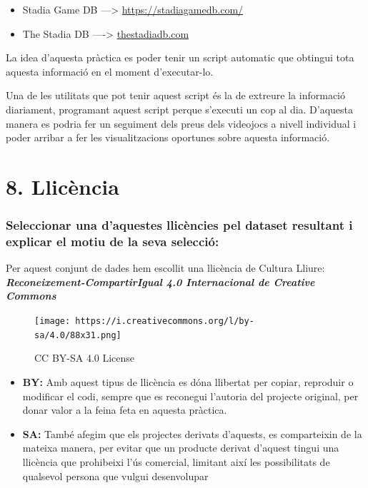 \documentclass[]{article}
\providecommand{\tightlist}{%
  \setlength{\itemsep}{0pt}\setlength{\parskip}{0pt}}
\begin{document}
\begin{itemize}
\tightlist
\item
  Stadia Game DB ---\textgreater{} \url{https://stadiagamedb.com/}
\item
  The Stadia DB ----\textgreater{} \url{thestadiadb.com}
\end{itemize}

La idea d'aquesta pràctica es poder tenir un script automatic que
obtingui tota aquesta informació en el moment d'executar-lo.

Una de les utilitats que pot tenir aquest script és la de extreure la
informació diariament, programant aquest script perque s'executi un cop
al dia. D'aquesta manera es podria fer un seguiment dels preus dels
videojocs a nivell individual i poder arribar a fer les visualitzacions
oportunes sobre aquesta informació.

\hypertarget{llicuxe8ncia}{%
\section{8. Llicència}\label{llicuxe8ncia}}

\hypertarget{seleccionar-una-daquestes-llicuxe8ncies-pel-dataset-resultant-i-explicar-el-motiu-de-la-seva-selecciuxf3}{%
\subsubsection{Seleccionar una d'aquestes llicències pel dataset
resultant i explicar el motiu de la seva
selecció:}\label{seleccionar-una-daquestes-llicuxe8ncies-pel-dataset-resultant-i-explicar-el-motiu-de-la-seva-selecciuxf3}}

Per aquest conjunt de dades hem escollit una llicència de Cultura
Lliure: \textbf{\emph{Reconeixement-CompartirIgual 4.0 Internacional de
Creative Commons}}

\begin{figure}
\centering
\texttt{[image: https://i.creativecommons.org/l/by-sa/4.0/88x31.png]}
\caption{CC BY-SA 4.0 License}
\end{figure}

\begin{itemize}
\tightlist
\item
  \textbf{BY:} Amb aquest tipus de llicència es dóna llibertat per
  copiar, reproduir o modificar el codi, sempre que es reconegui
  l'autoria del projecte original, per donar valor a la feina feta en
  aquesta pràctica.
\item
  \textbf{SA:} També afegim que els projectes derivats d'aquests, es
  comparteixin de la mateixa manera, per evitar que un producte derivat
  d'aquest tingui una llicència que prohibeixi l'ús comercial, limitant
  així les possibilitats de qualsevol persona que vulgui desenvolupar
\end{itemize}
\end{document}
